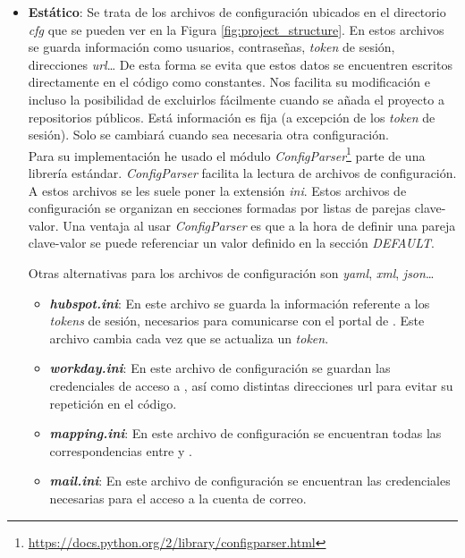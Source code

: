 \begin{itemize}[leftmargin=*]
\item \textbf{Estático}: Se trata de los archivos de configuración ubicados en el directorio \textit{cfg} que se pueden ver en la Figura \ref{fig:project_structure}.
En estos archivos se guarda información como usuarios, contraseñas, \textit{token} de sesión, direcciones \textit{url}\ldots
De esta forma se evita que estos datos se encuentren escritos directamente en el código como constantes. Nos facilita su modificación e
incluso la posibilidad de excluirlos fácilmente cuando se añada el proyecto a repositorios públicos.
Está información es fija (a excepción de los \textit{token} de sesión). Solo se cambiará cuando sea necesaria otra configuración.\\

Para su implementación he usado el módulo \textit{ConfigParser}\footnote{\url{https://docs.python.org/2/library/configparser.html}} parte de una librería estándar. \textit{ConfigParser} facilita la lectura de archivos de configuración. A estos archivos se les suele poner la extensión \textit{ini}. %
Estos archivos de configuración se organizan en secciones formadas por listas de parejas clave-valor.
Una ventaja al usar \textit{ConfigParser} es que a la hora de definir una pareja clave-valor se puede referenciar un valor definido en la sección \textit{DEFAULT}. 


Otras alternativas para los archivos de configuración son \textit{yaml}, \textit{xml}, \textit{json}\ldots


\begin{itemize}
	\item [\textendash] \textbf{\textit{hubspot.ini}}: En este archivo se guarda la información referente a los \textit{tokens} de sesión, necesarios para comunicarse con el portal de \hs{}. 
	Este archivo cambia cada vez que se actualiza un \textit{token}.
	\item [\textendash] \textbf{\textit{workday.ini}}: En este archivo de configuración se 
	guardan las credenciales de acceso a \wday{}, así como distintas direcciones url para evitar su repetición en el código.
	\item [\textendash] \textbf{\textit{mapping.ini}}: En este archivo de configuración se encuentran todas las correspondencias entre \hs{} y \wday.
	\item [\textendash] \textbf{\textit{mail.ini}}: En este archivo de configuración se encuentran las credenciales necesarias para el acceso a la cuenta de correo.
\end{itemize}





\end{itemize}
